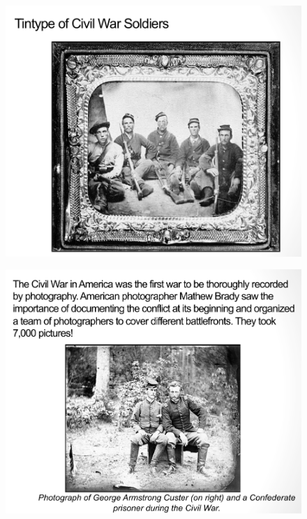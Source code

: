 \documentclass{beamer}
\begin{document}
\begin{frame}
	\begin{figure}
		\centering
		\includegraphics[scale=0.4]{91.jpg}
	\end{figure}
\end{frame}


\begin{frame}
	\begin{figure}
		\centering
		\includegraphics[scale=0.4]{92.jpg}
	\end{figure}
\end{frame}
\end{document}
